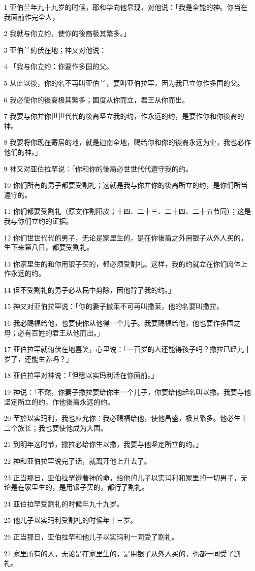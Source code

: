 \par 1 亚伯兰年九十九岁的时候，耶和华向他显现，对他说：「我是全能的神。你当在我面前作完全人，
\par 2 我就与你立约，使你的後裔极其繁多。」
\par 3 亚伯兰俯伏在地；神又对他说：
\par 4 「我与你立约：你要作多国的父。
\par 5 从此以後，你的名不再叫亚伯兰，要叫亚伯拉罕，因为我已立你作多国的父。
\par 6 我必使你的後裔极其繁多；国度从你而立，君王从你而出。
\par 7 我要与你并你世世代代的後裔坚立我的约，作永远的约，是要作你和你後裔的神。
\par 8 我要将你现在寄居的地，就是迦南全地，赐给你和你的後裔永远为业，我也必作他们的神。」
\par 9 神又对亚伯拉罕说：「你和你的後裔必世世代代遵守我的约。
\par 10 你们所有的男子都要受割礼；这就是我与你并你的後裔所立的约，是你们所当遵守的。
\par 11 你们都要受割礼（原文作割阳皮；十四、二十三、二十四、二十五节同）；这是我与你们立约的证据。
\par 12 你们世世代代的男子，无论是家里生的，是在你後裔之外用银子从外人买的，生下来第八日，都要受割礼。
\par 13 你家里生的和你用银子买的，都必须受割礼。这样，我的约就立在你们肉体上作永远的约。
\par 14 但不受割礼的男子必从民中剪除，因他背了我的约。」
\par 15 神又对亚伯拉罕说：「你的妻子撒莱不可再叫撒莱，他的名要叫撒拉。
\par 16 我必赐福给他，也要使你从他得一个儿子。我要赐福给他，他也要作多国之母；必有百姓的君王从他而出。」
\par 17 亚伯拉罕就俯伏在地喜笑，心里说：「一百岁的人还能得孩子吗？撒拉已经九十岁了，还能生养吗？」
\par 18 亚伯拉罕对神说：「但愿以实玛利活在你面前。」
\par 19 神说：「不然，你妻子撒拉要给你生一个儿子，你要给他起名叫以撒。我要与他坚定所立的约，作他後裔永远的约。
\par 20 至於以实玛利，我也应允你：我必赐福给他，使他昌盛，极其繁多。他必生十二个族长；我也要使他成为大国。
\par 21 到明年这时节，撒拉必给你生以撒，我要与他坚定所立的约。」
\par 22 神和亚伯拉罕说完了话，就离开他上升去了。
\par 23 正当那日，亚伯拉罕遵著神的命，给他的儿子以实玛利和家里的一切男子，无论是在家里生的，是用银子买的，都行了割礼。
\par 24 亚伯拉罕受割礼的时候年九十九岁。
\par 25 他儿子以实玛利受割礼的时候年十三岁。
\par 26 正当那日，亚伯拉罕和他儿子以实玛利一同受了割礼。
\par 27 家里所有的人，无论是在家里生的，是用银子从外人买的，也都一同受了割礼。

